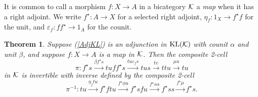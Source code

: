 \documentclass[a4paper,10pt]{article}
\newtheorem{theorem}{Theorem}
\newcommand{\bk}{{\cal{K}}}
\numberwithin{equation}{section}
\begin{document}
It is common to call a morphism $f:X \longrightarrow A$ in a bicategory $\bk$ 
a \textit{map} when it has a right adjoint. We write $f^{\star} : A \longrightarrow X$
for a selected right adjoint, $\eta_f :1_X \longrightarrow f^{\star} f$ for the unit, and $\varepsilon_f :f f^{\star} \longrightarrow 1_A$ for the counit.

\begin{theorem}\label{ThmAdjKL}
Suppose (\ref{AdjKL}) is an adjunction in $\mathrm{KL}(\bk)$ with counit $\alpha$ and unit $\beta$, and suppose $f:X \longrightarrow A$ is a map in $\bk$. Then the composite 2-cell 
\begin{equation} \label{pi}
\pi  : f^{\star}s\overset{\beta  f^{\star}s}{\longrightarrow }t
u f f^{\star}s\overset{t u \varepsilon _{f}s}{\longrightarrow }t u s
\overset{t \upsilon }{\longrightarrow }t t u\overset{\mu  u}{\longrightarrow}t u
\end{equation}
in $\bk$ is invertible with inverse defined by the composite 2-cell
\begin{equation} \label{pi-inv}
\pi ^{-1} : t u\overset{\eta _{f} t u}{\longrightarrow }f^{\star}f t u\overset{f^{\star}\phi  u}{\longrightarrow }f^{\star}s f u\overset{f^{\star}s \alpha }{\longrightarrow }f^{\star}s s\overset{f^{\star}\mu }{\longrightarrow}f^{\star}s .
\end{equation}


\end{theorem}
\end{document}
